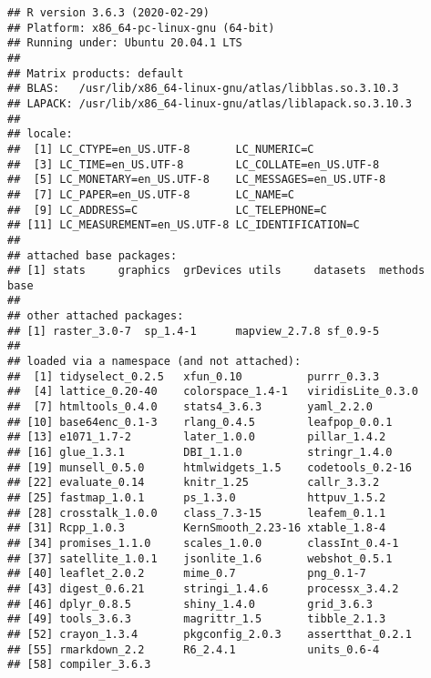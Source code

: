 \documentclass[]{article}
\begin{document}
\begin{verbatim}
## R version 3.6.3 (2020-02-29)
## Platform: x86_64-pc-linux-gnu (64-bit)
## Running under: Ubuntu 20.04.1 LTS
## 
## Matrix products: default
## BLAS:   /usr/lib/x86_64-linux-gnu/atlas/libblas.so.3.10.3
## LAPACK: /usr/lib/x86_64-linux-gnu/atlas/liblapack.so.3.10.3
## 
## locale:
##  [1] LC_CTYPE=en_US.UTF-8       LC_NUMERIC=C              
##  [3] LC_TIME=en_US.UTF-8        LC_COLLATE=en_US.UTF-8    
##  [5] LC_MONETARY=en_US.UTF-8    LC_MESSAGES=en_US.UTF-8   
##  [7] LC_PAPER=en_US.UTF-8       LC_NAME=C                 
##  [9] LC_ADDRESS=C               LC_TELEPHONE=C            
## [11] LC_MEASUREMENT=en_US.UTF-8 LC_IDENTIFICATION=C       
## 
## attached base packages:
## [1] stats     graphics  grDevices utils     datasets  methods   base     
## 
## other attached packages:
## [1] raster_3.0-7  sp_1.4-1      mapview_2.7.8 sf_0.9-5     
## 
## loaded via a namespace (and not attached):
##  [1] tidyselect_0.2.5   xfun_0.10          purrr_0.3.3       
##  [4] lattice_0.20-40    colorspace_1.4-1   viridisLite_0.3.0 
##  [7] htmltools_0.4.0    stats4_3.6.3       yaml_2.2.0        
## [10] base64enc_0.1-3    rlang_0.4.5        leafpop_0.0.1     
## [13] e1071_1.7-2        later_1.0.0        pillar_1.4.2      
## [16] glue_1.3.1         DBI_1.1.0          stringr_1.4.0     
## [19] munsell_0.5.0      htmlwidgets_1.5    codetools_0.2-16  
## [22] evaluate_0.14      knitr_1.25         callr_3.3.2       
## [25] fastmap_1.0.1      ps_1.3.0           httpuv_1.5.2      
## [28] crosstalk_1.0.0    class_7.3-15       leafem_0.1.1      
## [31] Rcpp_1.0.3         KernSmooth_2.23-16 xtable_1.8-4      
## [34] promises_1.1.0     scales_1.0.0       classInt_0.4-1    
## [37] satellite_1.0.1    jsonlite_1.6       webshot_0.5.1     
## [40] leaflet_2.0.2      mime_0.7           png_0.1-7         
## [43] digest_0.6.21      stringi_1.4.6      processx_3.4.2    
## [46] dplyr_0.8.5        shiny_1.4.0        grid_3.6.3        
## [49] tools_3.6.3        magrittr_1.5       tibble_2.1.3      
## [52] crayon_1.3.4       pkgconfig_2.0.3    assertthat_0.2.1  
## [55] rmarkdown_2.2      R6_2.4.1           units_0.6-4       
## [58] compiler_3.6.3
\end{verbatim}
\end{document}
